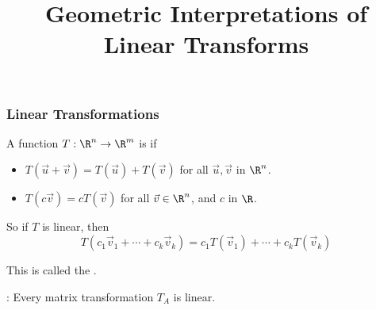 \title{Geometric Interpretations of Linear Transforms} 
\subtitle{\SubTitleName}
\institute[]{\Course}
\author{\Instructor}
\maketitle   








\begin{frame}
\frametitle{Linear Transformations}

A function $T:\R^n \rightarrow \R^m$ is  if

\begin{itemize}
    \item $T(\vec u+ \vec v) = T(\vec u) + T(\vec v)$ for all $\vec u, \vec v$ in $\R^n$.
    \item $T(c \vec v) = cT(\vec v)$ for all $\vec v \in \R^n$, and $c$ in $\R$.
\end{itemize}


So if $T$ is linear, then $$ T(c_1\vec v_1+\cdots+c_k\vec v_k) =  c_1T(\vec v_1)+\cdots+c_kT(\vec v_k)  $$

This is called the . %

 
\vspace{0.5cm} 

: Every matrix transformation $T_A$ is linear.

\end{frame}




